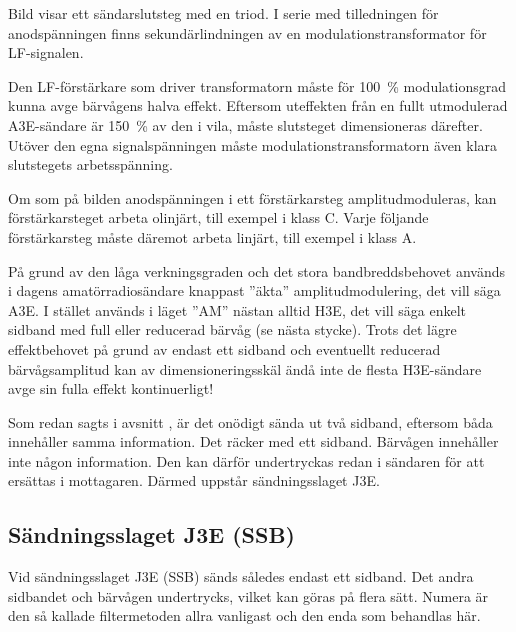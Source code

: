 
Bild  visar ett sändarslutsteg med en triod.
I serie med tilledningen för anodspänningen finns sekundärlindningen av en
modulationstransformator för LF-signalen.

Den LF-förstärkare som driver transformatorn måste för 100~\% modulationsgrad
kunna avge bärvågens halva effekt.
Eftersom uteffekten från en fullt utmodulerad A3E-sändare är 150~\% av den i
vila, måste slutsteget dimensioneras därefter.
Utöver den egna signalspänningen måste modulationstransformatorn även klara
slutstegets arbetsspänning.

Om som på bilden anodspänningen i ett förstärkarsteg amplitudmoduleras,
kan förstärkarsteget arbeta olinjärt, till exempel i klass C.
Varje följande förstärkarsteg måste däremot arbeta linjärt, till exempel i klass A.

På grund av den låga verkningsgraden och det stora bandbreddsbehovet används i
dagens amatörradiosändare knappast ''äkta'' amplitudmodulering,
det vill säga A3E.
I stället används i läget ''AM'' nästan alltid H3E, det vill säga enkelt
sidband med full eller reducerad bärvåg (se nästa stycke).
Trots det lägre effektbehovet på grund av endast ett sidband och eventuellt
reducerad bärvågsamplitud kan av dimensioneringsskäl ändå inte de flesta
H3E-sändare avge sin fulla effekt kontinuerligt!

Som redan sagts i avsnitt , är det onödigt sända ut två sidband,
eftersom båda innehåller samma information.
Det räcker med ett sidband.
Bärvågen innehåller inte någon information.
Den kan därför undertryckas redan i sändaren för att ersättas i mottagaren.
Därmed uppstår sändningsslaget J3E.

\newpage
\subsection{Sändningsslaget J3E (SSB)}

Vid sändningsslaget J3E (SSB) sänds således endast ett sidband.
Det andra sidbandet och bärvågen undertrycks, vilket kan göras på flera sätt.
Numera är den så kallade filtermetoden allra vanligast och den enda som
behandlas här.


